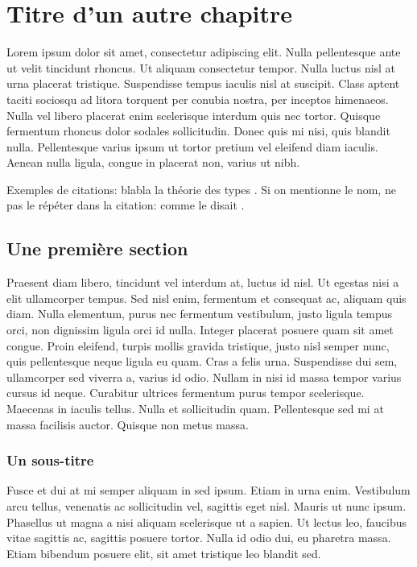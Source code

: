 \chapter{Titre d'un autre chapitre}

Lorem ipsum dolor sit amet, consectetur adipiscing elit. Nulla pellentesque
ante ut velit tincidunt rhoncus. Ut aliquam consectetur tempor. Nulla luctus
nisl at urna placerat tristique. Suspendisse tempus iaculis nisl at
suscipit. Class aptent taciti sociosqu ad litora torquent per conubia
nostra, per inceptos himenaeos. Nulla vel libero placerat enim scelerisque
interdum quis nec tortor. Quisque fermentum rhoncus dolor sodales
sollicitudin. Donec quis mi nisi, quis blandit nulla. Pellentesque varius
ipsum ut tortor pretium vel eleifend diam iaculis. Aenean nulla ligula,
congue in placerat non, varius ut nibh.

Exemples de citations: blabla la théorie des types
\citep{DBLPjournals/jsyml/Turing48}. Si on mentionne le nom, ne pas le
répéter dans la citation: comme le disait
\citet{DBLPjournals/jsyml/Turing48}.

\section{Une première section}

Praesent diam libero, tincidunt vel interdum at, luctus id nisl. Ut egestas
nisi a elit ullamcorper tempus. Sed nisl enim, fermentum et consequat ac,
aliquam quis diam. Nulla elementum, purus nec fermentum vestibulum, justo
ligula tempus orci, non dignissim ligula orci id nulla. Integer placerat
posuere quam sit amet congue. Proin eleifend, turpis mollis gravida
tristique, justo nisl semper nunc, quis pellentesque neque ligula eu quam.
Cras a felis urna. Suspendisse dui sem, ullamcorper sed viverra a, varius id
odio. Nullam in nisi id massa tempor varius cursus id neque. Curabitur
ultrices fermentum purus tempor scelerisque. Maecenas in iaculis tellus.
Nulla et sollicitudin quam. Pellentesque sed mi at massa facilisis auctor.
Quisque non metus massa.

\subsection{Un sous-titre}

Fusce et dui at mi semper aliquam in sed ipsum. Etiam in urna enim.
Vestibulum arcu tellus, venenatis ac sollicitudin vel, sagittis eget nisl.
Mauris ut nunc ipsum. Phasellus ut magna a nisi aliquam scelerisque ut a
sapien. Ut lectus leo, faucibus vitae sagittis ac, sagittis posuere tortor.
Nulla id odio dui, eu pharetra massa. Etiam bibendum posuere elit, sit amet
tristique leo blandit sed.


